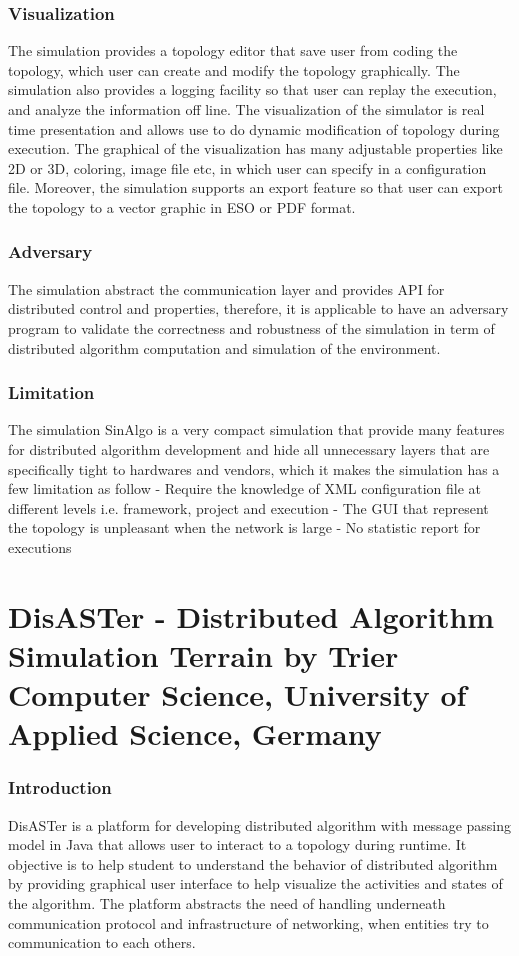 \subsubsection{Visualization}
The simulation provides a topology editor that save user from coding the topology, which user can create and modify the topology graphically. The simulation also provides a logging facility so that user can replay the execution, and analyze the information off line. The visualization of the simulator is real time presentation and allows use to do dynamic modification of topology during execution. The graphical of the visualization has many adjustable properties like 2D or 3D, coloring, image file etc, in which user can specify in a configuration file. Moreover, the simulation supports an export feature so that user can export the topology to a vector graphic in ESO or PDF format.

\subsubsection{Adversary}
The simulation abstract the communication layer and provides API for distributed control and properties, therefore, it is applicable to have an adversary program to validate the correctness and robustness of the simulation in term of distributed algorithm computation and simulation of the environment.

\subsubsection{Limitation}
The simulation SinAlgo is a very compact simulation that provide many features for distributed algorithm development and hide all unnecessary layers that are specifically tight to hardwares and vendors, which it makes the simulation has a few limitation as follow
- Require the knowledge of XML configuration file at different levels i.e. framework, project and execution
- The GUI that represent the topology is unpleasant when the network is large
- No statistic report for executions


\section{DisASTer - Distributed Algorithm Simulation Terrain by Trier Computer Science, University of Applied Science, Germany}
\subsubsection{Introduction}
DisASTer is a platform for developing distributed algorithm with message passing model in Java that allows user to interact to a topology during runtime. It objective is to help student to understand the behavior of distributed algorithm by providing graphical user interface to help visualize the activities and states of the algorithm. The platform abstracts the need of handling underneath communication protocol and infrastructure of networking, when entities try to communication to each others.

